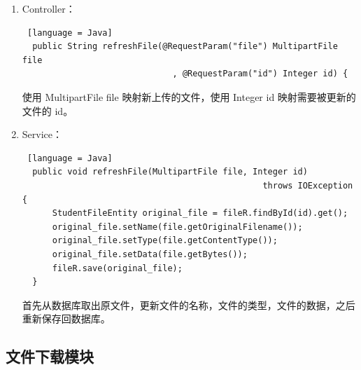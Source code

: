 \begin{enumerate}
  \item Controller：
        \begin{lstlisting} [language = Java]
  public String refreshFile(@RequestParam("file") MultipartFile file
                              , @RequestParam("id") Integer id) {
  \end{lstlisting}
        使用 MultipartFile file 映射新上传的文件，使用 Integer id 映射需要被更新的文件的 id。
  \item Service：
        \begin{lstlisting} [language = Java]
  public void refreshFile(MultipartFile file, Integer id) 
                                                throws IOException {
      StudentFileEntity original_file = fileR.findById(id).get();
      original_file.setName(file.getOriginalFilename());
      original_file.setType(file.getContentType());
      original_file.setData(file.getBytes());
      fileR.save(original_file);
  }
  \end{lstlisting}
        首先从数据库取出原文件，更新文件的名称，文件的类型，文件的数据，之后重新保存回数据库。
\end{enumerate}

\subsection{文件下载模块}

